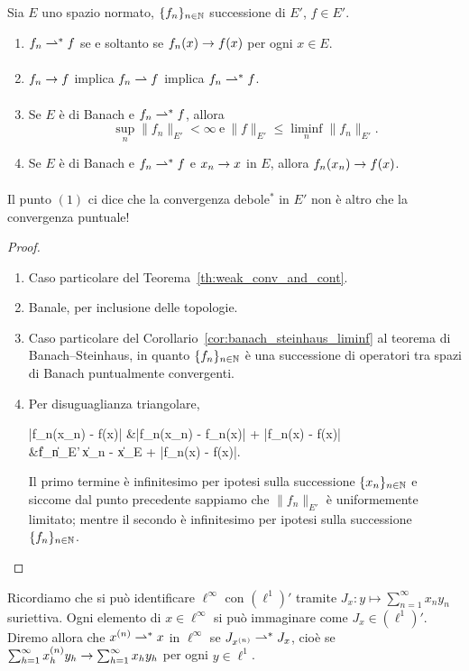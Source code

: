 \begin{lemma}
	Sia $E$ uno spazio normato, $\{f_n\}_{n \in \mathbb{N}}$ successione di $E'$, $f \in E'$.
	\begin{enumerate}
		\item $f_n \rightharpoonup^* f$ se e soltanto se $f_n(x) \underset{{}}{\rightarrow} f(x)$ per ogni $x \in E$.
		\item $f_n \underset{{}}{\rightarrow} f$ implica $f_n \rightharpoonup f$ implica $f_n \rightharpoonup^* f$.
		\item Se $E$ è di Banach e $f_n \rightharpoonup^* f$, allora
		\begin{equation*}
			\sup_n \|f_n\|_{E'} < \infty \ \text{e}\ \|f\|_{E'} \leq \liminf_n \|f_n\|_{E'}.
		\end{equation*}
		\item Se $E$ è di Banach e $f_n \rightharpoonup^* f$ e $x_n \underset{{}}{\rightarrow} x$ in $E$, allora $f_n(x_n) \underset{{}}{\rightarrow} f(x)$.
	\end{enumerate}
\end{lemma}
\begin{remark}
	Il punto $(1)$ ci dice che la convergenza debole$^*$ in $E'$ non è altro che la convergenza puntuale!
\end{remark}
\begin{proof}
	\leavevmode
	\begin{enumerate}
		\item Caso particolare del Teorema~\ref{th:weak_conv_and_cont}.
		\item Banale, per inclusione delle topologie.
		\item Caso particolare del Corollario~\ref{cor:banach_steinhaus_liminf} al teorema di Banach--Steinhaus, in quanto $\{f_n\}_{n \in \mathbb{N}}$ è una successione di operatori tra spazi di Banach puntualmente convergenti.
		\item Per disuguaglianza triangolare,
		\begin{eqalign*}
			|f_n(x_n) - f(x)| &\leq |f_n(x_n) - f_n(x)| + |f_n(x) - f(x)|\\
			&\leq \|f_n\|_{E'}\,\|x_n - x\|_E + |f_n(x) - f(x)|.
		\end{eqalign*}
		Il primo termine è infinitesimo per ipotesi sulla successione $\{x_n\}_{n \in \mathbb{N}}$ e siccome dal punto precedente sappiamo che $\|f_n\|_{E'}$ è uniformemente limitato; mentre il secondo è infinitesimo per ipotesi sulla successione $\{f_n\}_{n \in \mathbb{N}}$.
	\end{enumerate}
\end{proof}

\begin{example}
	Ricordiamo che si può identificare $\ell^\infty$ con $(\ell^1)'$ tramite $J_x : y \mapsto \sum_{n=1}^\infty x_n y_n$ suriettiva. Ogni elemento di $x \in \ell^\infty$ si può immaginare come $J_x \in (\ell^1)'$. Diremo allora che $x^{(n)} \rightharpoonup^* x$ in $\ell^\infty$ se $J_{x^{(n)}} \rightharpoonup^* J_x$, cioè se $\sum_{h=1}^\infty x^{(n)}_h y_h \underset{{}}{\rightarrow} \sum_{h=1}^\infty x_hy_h$ per ogni $y \in \ell^1$.
\end{example}

